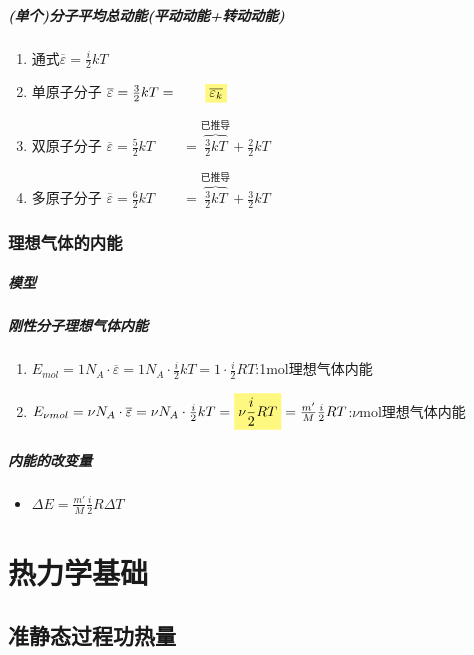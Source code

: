 \documentclass[UTF8,a4paper,12pt,scheme=chinese]{ctexbook}
\newcommand{\hla}[1]{%
	\colorbox{yellow!50}{$\displaystyle#1$}}
\begin{document}
	\paragraph{(单个)分子平均总动能(平动动能+转动动能)}
	\begin{enumerate}
		\item 通式$\overline{\varepsilon}=\frac{i}{2}kT$
		\item 单原子分子 $\overline{\varepsilon}=\frac{3}{2}kT=
		\qquad\hla{\overline{\varepsilon_k}}$
		\item 双原子分子 $\overline{\varepsilon}=\frac{5}{2}kT
		\qquad=
		\overbrace{\frac{3}{2}kT}
		^{\mbox{已推导}}
		+\frac{2}{2}kT
		$
		\item 多原子分子 $\overline{\varepsilon}=\frac{6}{2}kT
		\qquad=
		\overbrace{\frac{3}{2}kT}
		^{\mbox{已推导}}
		+\frac{3}{2}kT
		$
	\end{enumerate}
	\subsection{理想气体的内能}
	\paragraph{模型}
	\paragraph{刚性分子理想气体内能}
	\begin{enumerate}
		\item $E_{mol} = 1N_A\cdot\overline{\varepsilon} = 1N_A\cdot\frac{i}{2}kT = 1\cdot\frac{i}{2}RT$:\qquad 1mol理想气体内能
		\item $E_{\nu mol} = \nu N_A\cdot\overline{\varepsilon} = \nu N_A\cdot\frac{i}{2}kT = \hla{\nu\frac{i}{2}RT} = \frac{m'}{M}\frac{i}{2}RT$:\qquad $\nu$mol理想气体内能
	\end{enumerate}
	\paragraph{内能的改变量}
	\begin{itemize}
		\item $\Delta E = \frac{m'}{M}\frac{i}{2}R\Delta T$
	\end{itemize}
	\chapter{热力学基础}
	\section{准静态过程\quad 功\quad 热量}
\end{document}
